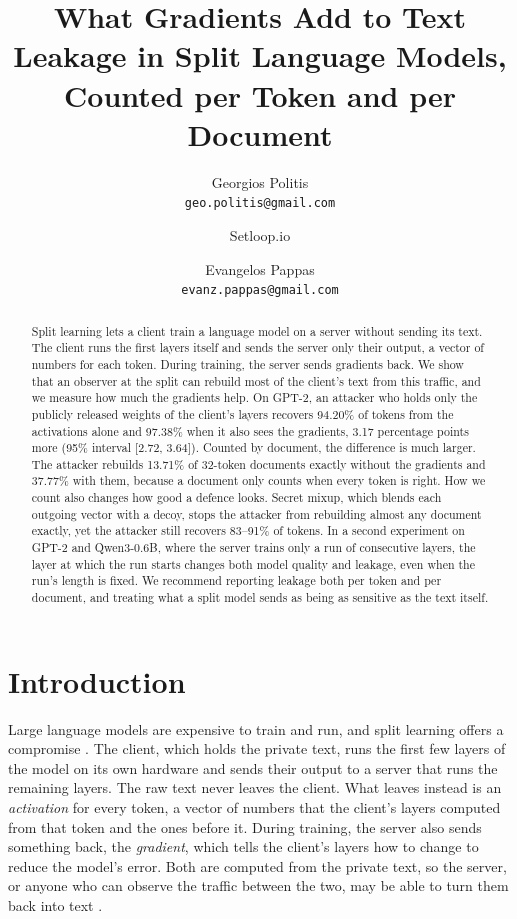 \documentclass[11pt]{article}
\title{What Gradients Add to Text Leakage in Split Language Models,\\ Counted per Token and per Document}
\author{Georgios Politis\\ {\small\texttt{geo.politis@gmail.com}} \and Setloop.io \and
  Evangelos Pappas\\ {\small\texttt{evanz.pappas@gmail.com}}}
\date{}
\begin{document}
\maketitle

\begin{abstract}
Split learning lets a client train a language model on a server without sending its text. The client runs the first layers itself and sends the server only their output, a vector of numbers for each token. During training, the server sends gradients back. We show that an observer at the split can rebuild most of the client's text from this traffic, and we measure how much the gradients help. On GPT-2, an attacker who holds only the publicly released weights of the client's layers recovers 94.20\% of tokens from the activations alone and 97.38\% when it also sees the gradients, 3.17 percentage points more (95\% interval [2.72, 3.64]). Counted by document, the difference is much larger. The attacker rebuilds 13.71\% of 32-token documents exactly without the gradients and 37.77\% with them, because a document only counts when every token is right. How we count also changes how good a defence looks. Secret mixup, which blends each outgoing vector with a decoy, stops the attacker from rebuilding almost any document exactly, yet the attacker still recovers 83--91\% of tokens. In a second experiment on GPT-2 and Qwen3-0.6B, where the server trains only a run of consecutive layers, the layer at which the run starts changes both model quality and leakage, even when the run's length is fixed. We recommend reporting leakage both per token and per document, and treating what a split model sends as being as sensitive as the text itself.
\end{abstract}

\section{Introduction}
\label{sec:intro}
Large language models are expensive to train and run, and split learning offers a compromise \cite{vepakomma2018split}. The client, which holds the private text, runs the first few layers of the model on its own hardware and sends their output to a server that runs the remaining layers. The raw text never leaves the client. What leaves instead is an \emph{activation} for every token, a vector of numbers that the client's layers computed from that token and the ones before it. During training, the server also sends something back, the \emph{gradient}, which tells the client's layers how to change to reduce the model's error. Both are computed from the private text, so the server, or anyone who can observe the traffic between the two, may be able to turn them back into text \cite{pasquini2021unleashing}.
\end{document}
